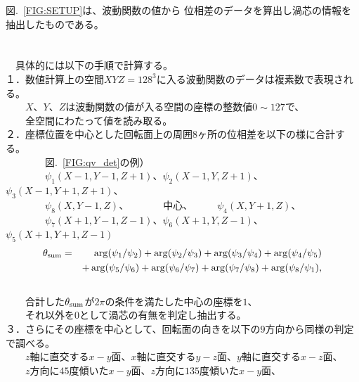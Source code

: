 \documentclass[12pt,a4paper]{jbook}
\begin{document}
			図.~\ref{FIG:SETUP}は、波動関数の値から
            位相差のデータを算出し渦芯の情報を抽出したものである。
            \\
            \\
            \\
            　具体的には以下の手順で計算する。
            \\
            １．数値計算上の空間$XYZ=128^3$に入る波動関数のデータは複素数で表現される。
            \\　　$X$、$Y$、$Z$は波動関数の値が入る空間の座標の整数値$0 \sim 127$で、
            \\　　全空間にわたって値を読み取る。
            \\
            ２．座標位置を中心とした回転面上の周囲$8$ヶ所の位相差を以下の様に合計する。
            \\
            　　　　図.~\ref{FIG:qv_det}の例）
            \\
            　　　　$\psi_1(X-1,Y-1,Z+1)$、$\psi_2(X-1,Y,Z+1)$、$\psi_3(X-1,Y+1,Z+1)$、
            \\
            　　　　$\psi_8(X,　Y-1,Z　　)$、　　　　中心、　　　$\psi_4(X,　Y+1,Z　)$、
            \\
            　　　　$\psi_7(X+1,Y-1,Z-1)$、$\psi_6(X+1,Y,Z-1)$、$\psi_5(X+1,Y+1,Z-1)$
            \begin{eqnarray}
            \theta_{\rm{sum}} & = & \arg(\psi_1/\psi_2)
            +\arg(\psi_2/\psi_3)
            +\arg(\psi_3/\psi_4)
            +\arg(\psi_4/\psi_5) \nonumber
            \\
            & &
            +\arg(\psi_5/\psi_6)
            +\arg(\psi_6/\psi_7)
            +\arg(\psi_7/\psi_8)
            +\arg(\psi_8/\psi_1),
            \end{eqnarray}
            \\
            　　合計した$\theta_{\rm{sum}}$が$2 \pi$の条件を満たした中心の座標を$1$、
            \\
            　　それ以外を$0$として渦芯の有無を判定し抽出する。
            \\
            ３．さらにその座標を中心として、回転面の向きを以下の$9$方向から同様の判定で調べる。
            \\
            　　$z$軸に直交する$x-y$面、$x$軸に直交する$y-z$面、$y$軸に直交する$x-z$面、
            \\
            　　$z$方向に$45$度傾いた$x-y$面、$z$方向に$135$度傾いた$x-y$面、
            \\
\end{document}
